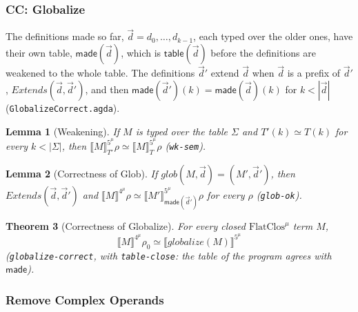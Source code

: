 \documentclass[10pt]{article}
\theoremstyle{acmplain}
\newtheorem{theorem}{Theorem}[section]
\newtheorem{lemma}[theorem]{Lemma}
\newcommand{\SEM}[1]{\llbracket #1 \rrbracket}
\newcommand{\key}[1]{\mathsf{#1}}
\newcommand{\pass}[1]{\mathit{#1}}
\newcommand{\Ml}[1]{\textrm{#1}^{\mu}}                  %
\begin{document}
\subsubsection{CC: Globalize}

The definitions made so far, $\vec{d} = d_0, \ldots, d_{k-1}$, each typed
over the older ones, have their own table, $\key{made}(\vec{d})$, which is
$\key{table}(\vec{d})$ before the definitions are weakened to the whole
table. The definitions $\vec{d}'$ extend $\vec{d}$ when $\vec{d}$ is a prefix
of $\vec{d}'$, $\mathit{Extends}(\vec{d}, \vec{d}')$, and then
$\key{made}(\vec{d}')(k) = \key{made}(\vec{d})(k)$ for $k < |\vec{d}|$
(\texttt{GlobalizeCorrect.agda}).
\begin{lemma}[Weakening]\label{lem:m-den-wk}
If $M$ is typed over the table $\Sigma$ and $T'(k) \simeq T(k)$ for every
$k < |\Sigma|$, then $\SEM{M}^{\Ml{5}}_{T'}\rho \simeq \SEM{M}^{\Ml{5}}_T\rho$
(\texttt{wk-sem}).
\end{lemma}
\begin{lemma}[Correctness of Glob]\label{lem:m-den-glob}
If $\pass{glob}(M, \vec{d}) = (M', \vec{d}')$, then $\mathit{Extends}(\vec{d}, \vec{d}')$ and
$\SEM{M}^{\Ml{4}}\rho \simeq \SEM{M'}^{\Ml{5}}_{\key{made}(\vec{d}')}\rho$ for every $\rho$
(\texttt{glob-ok}).
\end{lemma}
\begin{theorem}[Correctness of Globalize]\label{thm:m-den-globalize}
For every closed $\Ml{FlatClos}$ term $M$,
\[ \SEM{M}^{\Ml{4}}\rho_0 \simeq \SEM{\pass{globalize}(M)}^{\Ml{5}} \]
(\texttt{globalize-correct}, with \texttt{table-close}: the table of the
program agrees with $\key{made}$).
\end{theorem}

\subsubsection{Remove Complex Operands}
\end{document}
